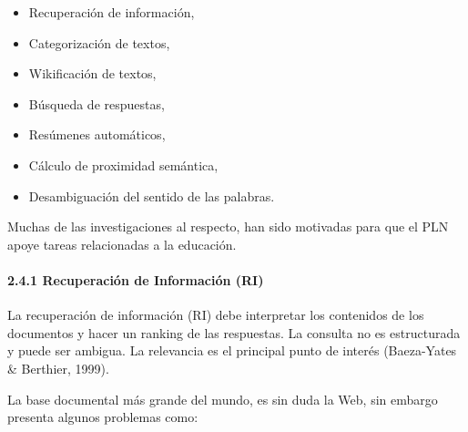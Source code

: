 \documentclass[letterpaper]{article}
\newcommand\textstylebibuscitbase[1]{#1}
\newcommand\liststyleWWviiiNumxi{%
\renewcommand\labelitemi{{\textbullet}}
\renewcommand\labelitemii{${\circ}$}
\renewcommand\labelitemiii{${\blacksquare}$}
\renewcommand\labelitemiv{{\textbullet}}
}
\begin{document}
\bigskip

\liststyleWWviiiNumxi
\begin{itemize}
\item {\sffamily
\textstylebibuscitbase{\foreignlanguage{spanish}{Recuperaci\'on de
informaci\'on,}}}
\item {\sffamily
\textstylebibuscitbase{\foreignlanguage{spanish}{Categorizaci\'on de
textos,}}}
\item {\sffamily
\textstylebibuscitbase{\foreignlanguage{spanish}{Wikificaci\'on de
textos,}}}
\item {\sffamily
\textstylebibuscitbase{\foreignlanguage{spanish}{B\'usqueda de
respuestas,}}}
\item {\sffamily
\textstylebibuscitbase{\foreignlanguage{spanish}{Res\'umenes
autom\'aticos,}}}
\item {\sffamily
\textstylebibuscitbase{\foreignlanguage{spanish}{C\'alculo de proximidad
sem\'antica,}}}
\item {\sffamily
\textstylebibuscitbase{\foreignlanguage{spanish}{Desambiguaci\'on del
sentido de las palabras.}}}
\end{itemize}

\bigskip

{\sffamily
\textstylebibuscitbase{\foreignlanguage{spanish}{Muchas de las
investigaciones al respecto, han sido motivadas para que el PLN apoye
tareas relacionadas a la educaci\'on.}}}


\bigskip

\paragraph{2.4.1 Recuperaci\'on de Informaci\'on (RI)}

\bigskip

{\sffamily
La recuperaci\'on de informaci\'on (RI) debe interpretar los contenidos
de los documentos y hacer un ranking de las respuestas. La consulta no
es estructurada y puede ser ambigua. La relevancia es el principal
punto de inter\'es (Baeza-Yates \& Berthier, 1999).}


\bigskip

{\sffamily
La base documental m\'as grande del mundo, es sin duda la Web, sin
embargo presenta algunos problemas como:}
\end{document}
